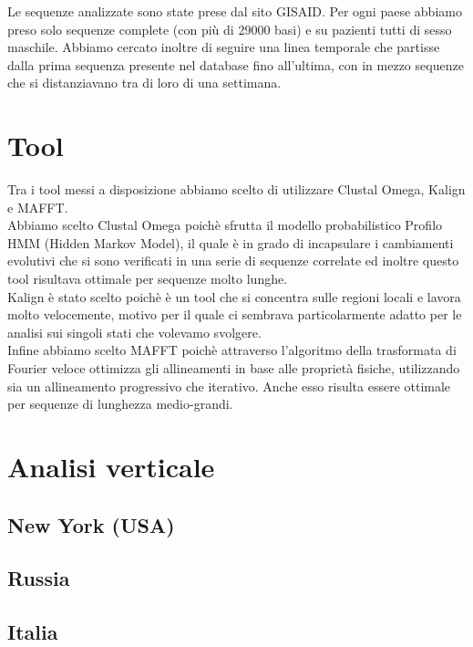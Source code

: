 \documentclass[a4paper,10pt]{article}
\begin{document}
Le sequenze analizzate sono state prese dal sito GISAID. Per ogni paese abbiamo preso solo sequenze complete (con più di 29000 basi) e su pazienti tutti di sesso maschile. Abbiamo cercato inoltre di seguire una linea temporale che partisse dalla prima sequenza presente nel database fino all'ultima, con in mezzo sequenze che si distanziavano tra di loro di una settimana.

\section{Tool}
Tra i tool messi a disposizione abbiamo scelto di utilizzare Clustal Omega, Kalign e MAFFT.\\
Abbiamo scelto Clustal Omega poichè sfrutta il modello probabilistico Profilo HMM (Hidden Markov Model), il quale è in grado di incapsulare i cambiamenti evolutivi che si sono verificati in una serie di sequenze correlate ed inoltre questo tool risultava ottimale per sequenze molto lunghe.\\
Kalign è stato scelto poichè è un tool che si concentra sulle regioni locali e lavora molto velocemente, motivo per il quale ci sembrava particolarmente adatto per le analisi sui singoli stati che volevamo svolgere.\\
Infine abbiamo scelto MAFFT poichè attraverso l'algoritmo della trasformata di Fourier veloce ottimizza gli allineamenti in base alle proprietà fisiche, utilizzando sia un allineamento progressivo che iterativo. Anche esso risulta essere ottimale per sequenze di lunghezza medio-grandi.

\section{Analisi verticale}

\subsection{New York (USA)}

\subsection{Russia}

\subsection{Italia}
\end{document}
